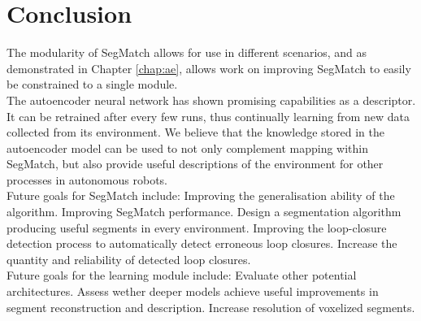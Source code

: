 \chapter{Conclusion}
\label{chap:conclusion}

The modularity of SegMatch allows for use in different scenarios, and as demonstrated in Chapter \ref{chap:ae}, allows work on improving SegMatch to easily be constrained to a single module.\\

The autoencoder neural network has shown promising capabilities as a descriptor. It can be retrained after every few runs, thus continually learning from new data collected from its environment. We believe that the knowledge stored in the autoencoder model can be used to not only complement mapping within SegMatch, but also provide useful descriptions of the environment for other processes in autonomous robots.\\

Future goals for SegMatch include: Improving the generalisation ability of the algorithm. Improving SegMatch performance. Design a segmentation algorithm producing useful segments in every environment. Improving the loop-closure detection process to automatically detect erroneous loop closures. Increase the quantity and reliability of detected loop closures.\\

Future goals for the learning module include: Evaluate other potential architectures. Assess wether deeper models achieve useful improvements in segment reconstruction and description. Increase resolution of voxelized segments.\\
